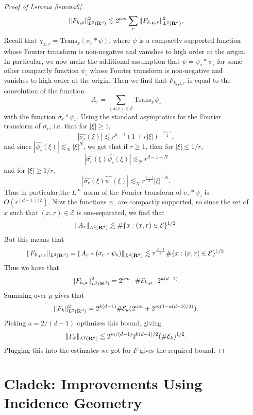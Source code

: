 \begin{proof}[Proof of Lemma \ref{lemma6}]
    \[ \| F_{k,\mu} \|_{L^2(\operatorname{\mathbf{R}}^d)}^2 \lesssim 2^{am} \sum_r \| F_{k,\mu,r} \|_{L^2(\operatorname{\mathbf{R}}^d)}^2. \]
    Recall that $\chi_{x,r} = \text{Trans}_x(\sigma_r * \psi)$, where $\psi$ is a compactly supported function whose Fourier transform is non-negative and vanishes to high order at the origin. In particular, we now make the additional assumption that $\psi = \psi_{\circ} * \psi_{\circ}$ for some other compactly function $\psi_{\circ}$ whose Fourier transform is non-negative and vanishes to high order at the origin. Then we find that $F_{k,\mu,r}$ is equal to the convolution of the function
    \[ A_r = \sum_{(x,r) \in \mathcal{E}} \text{Trans}_x \psi_{\circ} \]
    with the function $\sigma_r * \psi_{\circ}$. Using the standard asymptotics for the Fourier transform of $\sigma_r$, i.e. that for $|\xi| \geq 1$,
    \[ |\widehat{\sigma_r}(\xi)| \lesssim r^{d-1} (1 + r |\xi|)^{- \frac{d-1}{2}}, \]
    and since $|\widehat{\psi_\circ}(\xi)| \lesssim_N |\xi|^N$, we get that if $r \geq 1$, then for $|\xi| \leq 1/r$,
    \[ |\widehat{\sigma_r}(\xi) \widehat{\psi_\circ}(\xi)| \lesssim_N r^{d-1-N} \]
    and for $|\xi| \geq 1/r$,
    \[ |\widehat{\sigma_r}(\xi) \widehat{\psi_\circ}(\xi)| \lesssim_N r^{\frac{d-1}{2}} |\xi|^{-N}. \]
    Thus in particular,the $L^\infty$ norm of the Fourier transform of $\sigma_r * \psi_\circ$ is $O(r^{(d-1)/2})$. Now the functions $\psi_{\circ}$ are compactly supported, so since the set of $x$ such that $(x,r) \in \mathcal{E}$ is one-separated, we find that
    \[ \| A_r \|_{L^2(\operatorname{\mathbf{R}}^d)} \lesssim \# \{ x : (x,r) \in \mathcal{E} \}^{1/2}. \]
    But this means that
    \[ \| F_{k,\mu,r} \|_{L^2(\operatorname{\mathbf{R}}^d)} = \| A_r * (\sigma_r * \psi_{\circ}) \|_{L^2(\operatorname{\mathbf{R}}^d)} \lesssim r^{\frac{d-1}{2}} \# \{ x : (x,r) \in \mathcal{E} \}^{1/2}. \]
    Thus we have that
    \[ \| F_{k,\mu} \|_{L^2(\operatorname{\mathbf{R}}^d)}^2 = 2^{am} \cdot \# \mathcal{E}_{k,\mu} \cdot 2^{k(d-1)}. \]
    Summing over $\mu$ gives that
    \[ \| F_k \|_{L^2(\operatorname{\mathbf{R}}^d)}^2 = 2^{k(d-1)} \# \mathcal{E}_k (2^{am}  + 2^{m(1 - a(d-3)/2)}). \]
    Picking $a = 2/(d-1)$ optimizes this bound, giving
    \[ \| F_k \|_{L^2(\operatorname{\mathbf{R}}^d)} \lesssim 2^{m/(d-1)} 2^{k(d-1)/2} (\# \mathcal{E}_k)^{1/2}. \]
    Plugging this into the estimates we got for $F$ gives the required bound.
\end{proof}

\chapter{Cladek: Improvements Using Incidence Geometry}

